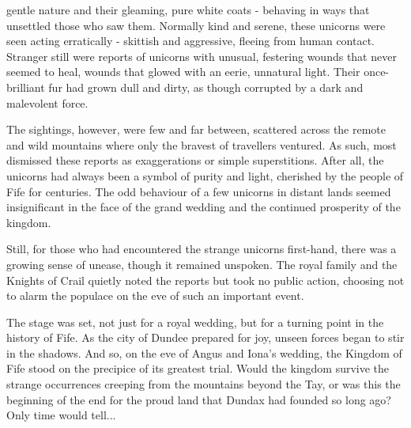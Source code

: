 \begin{multicols}{2}
{\entryfont \noindent gentle nature and their gleaming, pure white coats - behaving in ways that unsettled those who saw them. Normally kind and serene, these unicorns were seen acting erratically - skittish and aggressive, fleeing from human contact. Stranger still were reports of unicorns with unusual, festering wounds that never seemed to heal, wounds that glowed with an eerie, unnatural light. Their once-brilliant fur had grown dull and dirty, as though corrupted by a dark and malevolent force.

The sightings, however, were few and far between, scattered across the remote and wild mountains where only the bravest of travellers ventured. As such, most dismissed these reports as exaggerations or simple superstitions. After all, the unicorns had always been a symbol of purity and light, cherished by the people of Fife for centuries. The odd behaviour of a few unicorns in distant lands seemed insignificant in the face of the grand wedding and the continued prosperity of the kingdom.

Still, for those who had encountered the strange unicorns first-hand, there was a growing sense of unease, though it remained unspoken. The royal family and the Knights of Crail quietly noted the reports but took no public action, choosing not to alarm the populace on the eve of such an important event.

The stage was set, not just for a royal wedding, but for a turning point in the history of Fife. As the city of Dundee prepared for joy, unseen forces began to stir in the shadows. And so, on the eve of Angus and Iona's wedding, the Kingdom of Fife stood on the precipice of its greatest trial. Would the kingdom survive the strange occurrences creeping from the mountains beyond the Tay, or was this the beginning of the end for the proud land that Dundax had founded so long ago? Only time would tell...}
\end{multicols}
\vspace*{-4em}\hfill\\
\noindent{}%
\twocolumn

\clearpage

